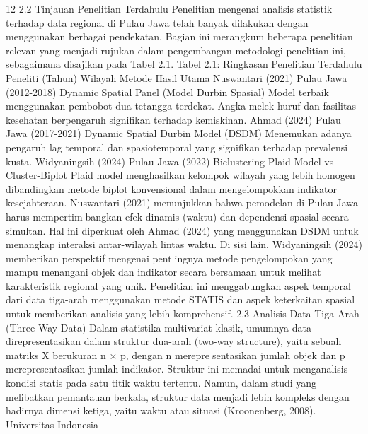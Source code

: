 12
2.2 Tinjauan Penelitian Terdahulu
Penelitian mengenai analisis statistik terhadap data regional di Pulau Jawa telah banyak
dilakukan dengan menggunakan berbagai pendekatan. Bagian ini merangkum beberapa
penelitian relevan yang menjadi rujukan dalam pengembangan metodologi penelitian ini,
sebagaimana disajikan pada Tabel 2.1.
Tabel 2.1: Ringkasan Penelitian Terdahulu
Peneliti
(Tahun) Wilayah Metode Hasil Utama
Nuswantari
(2021)
Pulau Jawa
(2012-2018)
Dynamic Spatial
Panel (Model
Durbin Spasial)
Model terbaik menggunakan pembobot
dua tetangga terdekat. Angka melek
huruf dan fasilitas kesehatan
berpengaruh signifikan terhadap
kemiskinan.
Ahmad
(2024)
Pulau Jawa
(2017-2021)
Dynamic Spatial
Durbin Model
(DSDM)
Menemukan adanya pengaruh lag
temporal dan spasiotemporal yang
signifikan terhadap prevalensi kusta.
Widyaningsih
(2024)
Pulau Jawa
(2022)
Biclustering Plaid
Model vs
Cluster-Biplot
Plaid model menghasilkan kelompok
wilayah yang lebih homogen
dibandingkan metode biplot
konvensional dalam mengelompokkan
indikator kesejahteraan.
Nuswantari (2021) menunjukkan bahwa pemodelan di Pulau Jawa harus mempertimbangkan efek dinamis (waktu) dan dependensi spasial secara simultan. Hal ini diperkuat
oleh Ahmad (2024) yang menggunakan DSDM untuk menangkap interaksi antar-wilayah
lintas waktu. Di sisi lain, Widyaningsih (2024) memberikan perspektif mengenai pentingnya metode pengelompokan yang mampu menangani objek dan indikator secara
bersamaan untuk melihat karakteristik regional yang unik. Penelitian ini menggabungkan
aspek temporal dari data tiga-arah menggunakan metode STATIS dan aspek keterkaitan
spasial untuk memberikan analisis yang lebih komprehensif.
2.3 Analisis Data Tiga-Arah (Three-Way Data)
Dalam statistika multivariat klasik, umumnya data direpresentasikan dalam struktur
dua-arah (two-way structure), yaitu sebuah matriks X berukuran n × p, dengan n merepresentasikan jumlah objek dan p merepresentasikan jumlah indikator. Struktur ini memadai
untuk menganalisis kondisi statis pada satu titik waktu tertentu. Namun, dalam studi yang
melibatkan pemantauan berkala, struktur data menjadi lebih kompleks dengan hadirnya
dimensi ketiga, yaitu waktu atau situasi (Kroonenberg, 2008).
Universitas Indonesia

